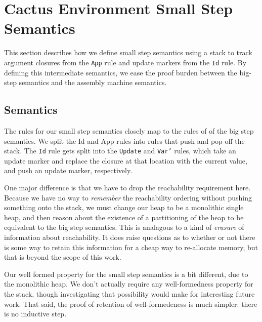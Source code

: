 \section{Cactus Environment Small Step Semantics} \label{sec:cesm}

This section describes how we define small step semantics using a stack to track
argument closures from the \texttt{App} rule and update markers from the
\texttt{Id} rule. By defining this intermediate semantics, we ease the proof
burden between the big-step semantics and the assembly machine semantics.   

\subsection{Semantics}

The rules for our small step semantics closely map to the rules of of the big
step semantics. We split the Id and App rules into rules that push and pop off
the stack. The \texttt{Id} rule gets split into the \texttt{Update} and
\texttt{Var'} rules, which take an update marker and replace the closure at that
location with the current value, and push an update marker, respectively. 

One major difference is that we have to drop the reachability requirement here.
Because we have no way to \emph{remember} the reachability ordering without
pushing something onto the stack, we must change our heap to be a monolithic
single heap, and then reason about the existence of a partitioning of the heap
to be equivalent to the big step semantics. This is analagous to a kind of
\emph{erasure} of information about reachability. It does raise questions as to
whether or not there is some way to retain this information for a cheap way to
re-allocate memory, but that is beyond the scope of this work.

Our well formed property for the small step semantics is a bit different, due to
the monolithic heap. We don't actually require any well-formedness property for
the stack, though investigating that possibility would make for interesting
future work. That said, the proof of retention of well-formedeness is much
simpler: there is no inductive step.   

